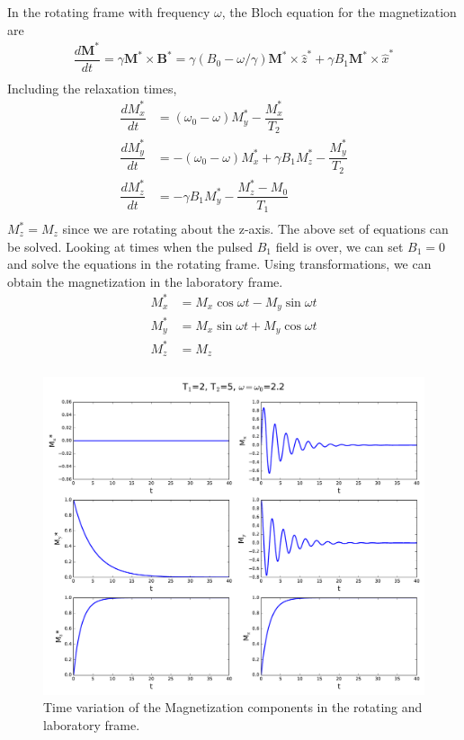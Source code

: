 \documentclass[aps,prb,onecolumn,notitlepage,showpacs,floatfix,superscriptaddress]{revtex4-1}
\begin{document}
In the rotating frame with frequency $\omega$, the Bloch equation for the magnetization are
\begin{equation}
\begin{split}
\dfrac{d {\bm M}^*}{dt} =\gamma {\bm M}^* \times {\bm B}^* =  \gamma (B_0 - \omega/\gamma) {\bm M}^* \times \hat{z}^* + \gamma B_1 {\bm M}^* \times \hat{x}^* \\
\end{split}
\end{equation}
Including the relaxation times,
\begin{equation}
\begin{split}
\dfrac{d M_x^*}{dt} &=  (\omega_0 - \omega) M_y^* -\dfrac{M_x^*}{T_2} \\
\dfrac{d M_y^*}{dt} &=  -(\omega_0 - \omega) M_x^*+\gamma B_1 M_z^* -\dfrac{M_y^*}{T_2} \\
\dfrac{d M_z^*}{dt} &=  -\gamma B_1 M_y^* -\dfrac{M_z^*-M_0}{T_1} \\
\end{split}
\end{equation}
$M_z^*=M_z$ since we are rotating about the z-axis. The above set of equations can be solved. Looking at times when the pulsed $B_1$ field is over, we can set $B_1 =0$ and solve the equations in the rotating frame. Using transformations, we can obtain the magnetization in the laboratory frame.
\begin{equation}
\begin{split}
M_x^* &= M_x \cos \omega t - M_y \sin \omega t \\
M_y^* &= M_x \sin \omega t + M_y \cos \omega t \\
M_z^* &= M_z\\
\end{split}
\end{equation}

\begin{figure}[hbtp]
\centering
\includegraphics[scale=0.5]{RF_LF.pdf}
\caption{Time variation of the Magnetization components in the rotating and laboratory frame.}
\end{figure}
\end{document}
